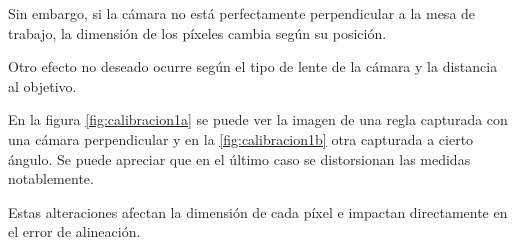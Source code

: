 Sin embargo, si la cámara no está perfectamente perpendicular a la mesa de trabajo, la dimensión de los píxeles cambia según su posición.\par
Otro efecto no deseado ocurre según el tipo de lente de la cámara y la distancia al objetivo.\par

En la figura \ref{fig:calibracion1a} se puede ver la imagen de una regla capturada con una cámara perpendicular y en la \ref{fig:calibracion1b} otra capturada a cierto ángulo. Se puede apreciar que en el último caso se distorsionan las medidas notablemente.\par 

Estas alteraciones afectan la dimensión de cada píxel e impactan directamente en el error de alineación.\par

